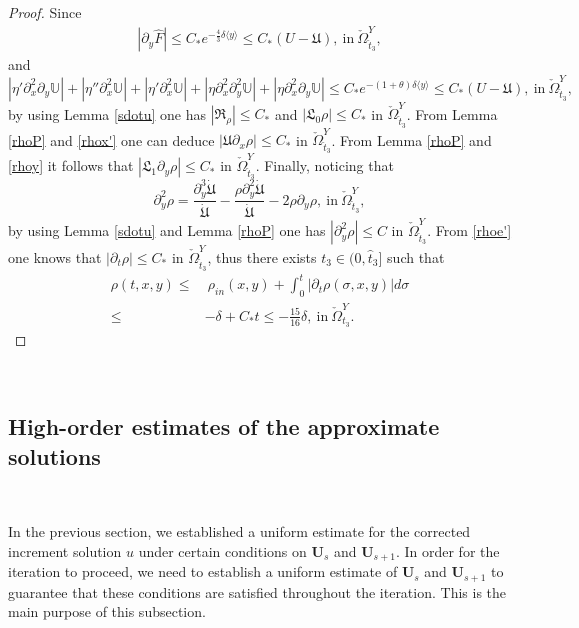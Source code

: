 \documentclass{amsart}
\numberwithin{equation}{section}
\newcommand\y{{{\langle y \rangle}}}
\begin{document}
\begin{proof}
Since
\begin{align*}
|\partial_{y}\hat{F}|
\leq C_{*}e^{-\frac{4}{3}\delta\y}
\leq C_{*}(U-\mathfrak{U}),~\text{in}~\check{\Omega}_{\hat{t}_{3}}^{Y},
\end{align*}
and
$$
|\eta'\partial_{x}^{2}\partial_{y}\mathbb{U}|+|\eta''\partial_{x}^{2}\mathbb{U}|+|\eta'\partial_{x}^{2}\mathbb{U}|
+|\eta\partial_{x}^{2}\partial_{y}^{2}\mathbb{U}|+|\eta\partial_{x}^{2}\partial_{y}\mathbb{U}|
\leq C_{*}e^{-(1+\theta)\delta\y}
\leq C_{*}(U-\mathfrak{U}),~\text{in}~\check{\Omega}_{\hat{t}_{3}}^{Y},
$$
by using Lemma \ref{sdotu} one has $|\mathfrak{R}_{\rho}|\leq C_{*}$ and $|\mathfrak{L}_{0}\rho|\leq C_{*}$ in $\check{\Omega}_{\hat{t}_{3}}^{Y}$. From Lemma \ref{rhoP} and \eqref{rhox'} one can deduce $|\mathfrak{U}\partial_{x}\rho|\leq C_{*}$ in $\check{\Omega}_{\hat{t}_{3}}^{Y}$.
From Lemma \eqref{rhoP} and \eqref{rhoy} it follows that $|\mathfrak{L}_{1}\partial_{y}\rho|\leq C_{*}$ in $\check{\Omega}_{\hat{t}_{3}}^{Y}$.
Finally, noticing that
$$\partial_{y}^{2}\rho=\frac{\partial_{y}^{3}\dot{\mathfrak{U}}}{\dot{\mathfrak{U}}}
                       -\frac{\rho\partial_{y}^{2}\dot{\mathfrak{U}}}{\dot{\mathfrak{U}}}
                       -2\rho\partial_{y}\rho,~\text{in}~\check{\Omega}_{\hat{t}_{3}}^{Y},$$
by using Lemma \ref{sdotu} and Lemma \ref{rhoP} one has $|\partial_{y}^{2}\rho|\leq C$ in $\check{\Omega}_{\hat{t}_{3}}^{Y}$. From \eqref{rhoe'} one knows that $|\partial_{t}\rho|\leq C_{*}$ in $\check{\Omega}_{\hat{t}_{3}}^{Y}$, thus there exists $t_{3}\in(0,\hat{t}_{3}]$ such that
\begin{align*}
\rho(t,x,y)
\leq&~\rho_{in}(x,y)+\int_{0}^{t}|\partial_{t}\rho(\sigma,x,y)|d\sigma\\
\leq&-\delta+C_{*}t
\leq -\frac{15}{16}\delta,~\text{in}~\check{\Omega}_{t_{3}}^{Y}.
\end{align*}

\end{proof}
~~~~~~~~~~

\subsection{High-order estimates of the approximate solutions}~

In the previous section, we established a uniform estimate for the corrected increment solution $u$ under certain conditions on $\mathbf{U}_{s}$ and $\mathbf{U}_{s+1}$. In order for the iteration to proceed, we need to establish a uniform estimate of $\mathbf{U}_{s}$ and $\mathbf{U}_{s+1}$ to guarantee that these conditions are satisfied throughout the iteration. This is the main purpose of this subsection.
\end{document}
